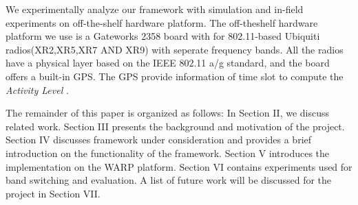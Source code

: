 We experimentally analyze our framework with simulation and in-field experiments on off-the-shelf hardware platform. The off-theshelf hardware platform we use is a Gateworks 2358 board with for 802.11-based Ubiquiti radios(XR2,XR5,XR7 AND XR9) with seperate frequency bands. All the radios have a physical layer based on the IEEE 802.11 a/g standard, and the board offers a built-in GPS. The GPS provide information of time slot to compute the \emph{Activity Level} .




The remainder of this paper is organized as follows: In Section II, we discuss related work. Section III presents the background and motivation of the project.  Section IV discusses framework under consideration and provides a brief introduction on the functionality of the framework. Section V introduces the implementation on the WARP platform. Section VI contains experiments used for band switching and evaluation.  A list of future work will be discussed for the project in Section VII.


